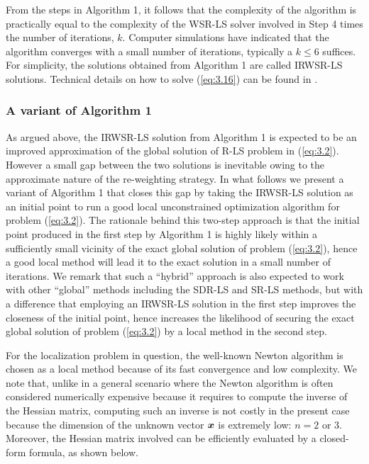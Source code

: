 \phantom{m}

From the steps in Algorithm 1, it follows that the complexity of the algorithm is practically equal to the complexity of the WSR-LS solver involved in Step 4 times the number of iterations, $k$. Computer simulations have indicated that the algorithm converges with a small number of iterations, typically a $k\leq6$  suffices. For simplicity, the solutions obtained from Algorithm 1 are called IRWSR-LS solutions. Technical details on how to solve (\ref{eq:3.16}) can be found in \cite{BeckStLi}.

\subsubsection{A variant of Algorithm 1}%

As argued above, the IRWSR-LS solution from Algorithm 1 is expected to be an improved approximation of the global solution of R-LS problem in (\ref{eq:3.2}). However a small gap between the two solutions is inevitable owing to the approximate nature of the re-weighting strategy. In what follows we present a variant of Algorithm 1 that closes this gap by taking the IRWSR-LS solution as an initial point to run a good local unconstrained optimization algorithm for problem (\ref{eq:3.2}).  The rationale behind this two-step approach is that the initial point produced in the first step by Algorithm 1 is highly likely within a sufficiently small vicinity of the exact global solution of problem (\ref{eq:3.2}), hence a good local method will lead it to the exact solution in a small number of iterations. We remark that such a ``hybrid'' approach is also expected to work with other ``global'' methods including the SDR-LS and SR-LS methods, but with a difference that employing an IRWSR-LS solution in the first step improves the closeness of the initial point, hence increases the likelihood of securing the exact global solution of problem (\ref{eq:3.2}) by a local method in the second step.

For the localization problem in question, the well-known Newton algorithm \cite{AntonLu} is chosen as a local method because of its fast convergence and low complexity. We note that, unlike in a general scenario where the Newton algorithm is often considered numerically expensive because it requires to compute the inverse of the Hessian matrix, computing such an inverse is not costly in the present case because the dimension of the unknown vector $\mbox{\boldmath$x$}$ is extremely low: $n = 2$ or $3$. Moreover, the Hessian matrix involved can be efficiently evaluated by a closed-form formula, as shown below.

